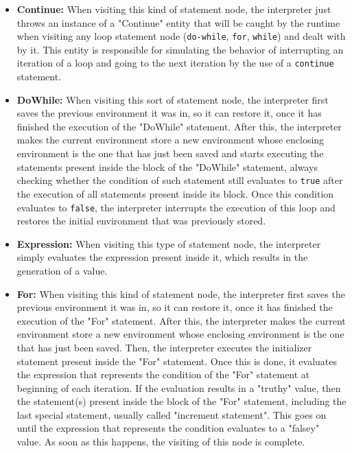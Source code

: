 \begin{itemize}
    \item \textbf{Continue:} When visiting this kind of statement node, the interpreter just throws an instance of a "Continue" entity that will be caught by the runtime when visiting any loop statement node (\texttt{do-while}, \texttt{for}, \texttt{while}) and dealt with by it. This entity is responsible for simulating the behavior of interrupting an iteration of a loop and going to the next iteration by the use of a \texttt{continue} statement.
    
    \item \textbf{DoWhile:} When visiting this sort of statement node, the interpreter first saves the previous environment it was in, so it can restore it, once it has finished the execution of the "DoWhile" statement. After this, the interpreter makes the current environment store a new environment whose enclosing environment is the one that has just been saved and starts executing the statements present inside the block of the "DoWhile" statement, always checking whether the condition of such statement still evaluates to \texttt{true} after the execution of all statements present inside its block. Once this condition evaluates to \texttt{false}, the interpreter interrupts the execution of this loop and restores the initial environment that was previously stored.
    
    \item \textbf{Expression:} When visiting this type of statement node, the interpreter simply evaluates the expression present inside it, which results in the generation of a value.
    
    \item \textbf{For:} When visiting this kind of statement node, the interpreter first saves the previous environment it was in, so it can restore it, once it has finished the execution of the "For" statement. After this, the interpreter makes the current environment store a new environment whose enclosing environment is the one that has just been saved. Then, the interpreter executes the initializer statement present inside the "For" statement. Once this is done, it evaluates the expression that represents the condition of the "For" statement at beginning of each iteration. If the evaluation results in a "truthy" value, then the statement(s) present inside the block of the "For" statement, including the last special statement, usually called "increment statement". This goes on until the expression that represents the condition evaluates to a "falsey" value. As soon as this happens, the visiting of this node is complete.
    

\end{itemize}

